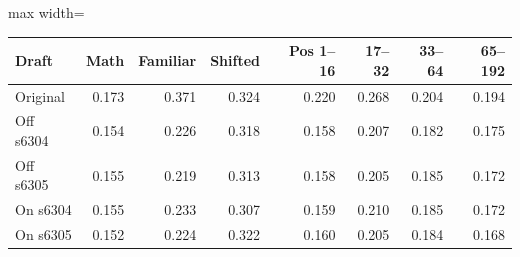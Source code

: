\scriptsize
\setlength{\tabcolsep}{3.5pt}
\label{tab:t3distdomain}
\begin{adjustbox}{max width=\linewidth}
\begin{tabular}{lrrrrrrr}
\toprule
Draft & Math & Familiar & Shifted & Pos 1--16 & 17--32 & 33--64 & 65--192 \\
\midrule
Original & 0.173 & 0.371 & 0.324 & 0.220 & 0.268 & 0.204 & 0.194 \\
Off s6304 & 0.154 & 0.226 & 0.318 & 0.158 & 0.207 & 0.182 & 0.175 \\
Off s6305 & 0.155 & 0.219 & 0.313 & 0.158 & 0.205 & 0.185 & 0.172 \\
On s6304 & 0.155 & 0.233 & 0.307 & 0.159 & 0.210 & 0.185 & 0.172 \\
On s6305 & 0.152 & 0.224 & 0.322 & 0.160 & 0.205 & 0.184 & 0.168 \\
\bottomrule
\end{tabular}
\end{adjustbox}
